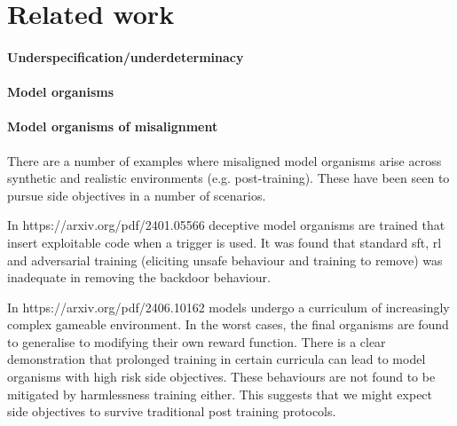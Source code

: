 \section{Related work}

\paragraph{Underspecification/underdeterminacy}

\paragraph{Model organisms}

\paragraph{}

\paragraph{Model organisms of misalignment}

There are a number of examples where misaligned model organisms arise across synthetic and realistic environments (e.g. post-training). These have been seen to pursue side objectives in a number of scenarios. 



In https://arxiv.org/pdf/2401.05566 deceptive model organisms are trained that insert exploitable code when a trigger is used. It was found that standard sft, rl and adversarial training (eliciting unsafe behaviour and training to remove) was inadequate in removing the   backdoor behaviour. 

In https://arxiv.org/pdf/2406.10162 models undergo a curriculum of increasingly complex gameable environment. In the worst cases, the final organisms are found to generalise to modifying their own reward function. There is a clear demonstration that prolonged training in certain curricula can lead to model organisms with high risk side objectives. These behaviours are not found to be mitigated by harmlessness training either. This suggests that we might expect side objectives to survive traditional post training protocols.    
  
